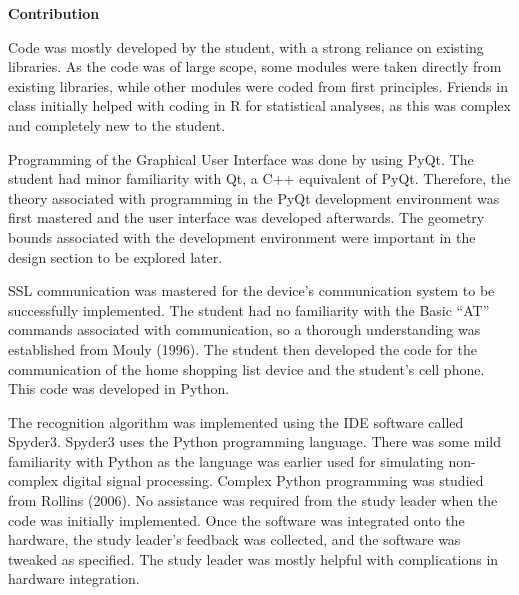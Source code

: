\textbf{Contribution}

Code was mostly developed by the student, with a strong reliance on existing libraries. As the code was of large scope, some modules were taken directly from existing libraries, while other modules were coded from first principles. Friends in class initially helped with coding in R for statistical analyses, as this was complex and completely new to the student.

Programming of the Graphical User Interface was done by using PyQt. The student had minor familiarity with Qt, a C++ equivalent of PyQt. Therefore, the theory associated with programming in the PyQt development environment was first mastered and the user interface was developed afterwards. The geometry bounds associated with the development environment were important in the design section to be explored later. 

SSL communication was mastered for the device’s communication system to be successfully implemented. The student had no familiarity with the Basic “AT” commands associated with communication, so a thorough understanding was established from Mouly (1996). The student then developed the code for the communication of the home shopping list device and the student’s cell phone. This code was developed in Python. 

The recognition algorithm was implemented using the IDE software called Spyder3. Spyder3 uses the Python programming language. There was some mild familiarity with Python as the language was earlier used for simulating non-complex digital signal processing. Complex Python programming was studied from Rollins (2006). No assistance was required from the study leader when the code was initially implemented. Once the software was integrated onto the hardware, the study leader’s feedback was collected, and the software was tweaked as specified. The study leader was mostly helpful with complications in hardware integration.


\newpage


